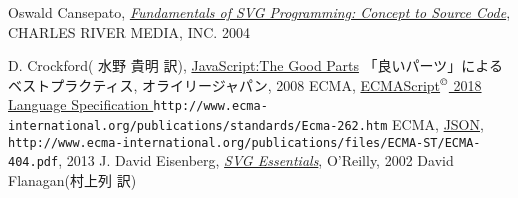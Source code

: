 \begin{thebibliography}{99}
 \iffalse
 \bibitem{WebGL}Andreas Anyuru(吉川 邦夫 訳),
\href{http://www.amazon.co.jp/%E5%AE%9F%E8%B7%B5%E3%83%97%E3%83%AD%E3%82%B0%E3%83%A9%E3%83%9F%E3%83%B3%E3%82%B0WebGL-HTML-JavaScript%E3%81%AB%E3%82%88%E3%82%8B3D%E3%82%B0%E3%83%A9%E3%83%95%E3%82%A3%E3%83%83%E3%82%AF%E3%82%B9%E9%96%8B%E7%99%BA-Programmer%E2%80%99s-SELECTION/dp/4798129534/ref=sr_1_1?ie=UTF8&qid=1365330500&sr=8-1&keywords=%E5%AE%9F%E8%B7%B5%E3%83%97%E3%83%AD%E3%82%B0%E3%83%A9%E3%83%9F%E3%83%B3%E3%82%B0WebGL}
{実践プログラミングWebGL HTML \& JavaScriptによる３Ｄグラフィック},
				 翔泳社, 2012年
				 \fi
\iffalse%
\bibitem{Cagle} Kurt Cagle, 
   \href{http://www.amazon.co.jp/exec/obidos/ASIN/1590590198/qid=1144561984/sr=1-4/ref=sr_1_10_4/249-1775097-0214759}
     {\it SVG Programming: The Graphical Web}, Apress 2002
\fi
\ifSeminor\else
  Oswald Cansepato, 
	\href{http://www.amazon.co.jp/exec/obidos/ASIN/1584502983/qid=1144561984/sr=1-1/ref=sr_1_10_1/249-1775097-0214759}
     {\it Fundamentals of SVG Programming: Concept to
	Source Code}, 
     CHARLES RIVER MEDIA, INC. 2004
\fi
\iffalse
 \bibitem{Cox}David Cox, John Little, Donal O'Shea(落合、示野、西山、室、
	山本訳), グレブナ基底と代数多
	様体入門(上), シュプリンガー・フェアラーク東京 2000
         \fi
\ifSeminor\else
 D. Crockford( 水野 貴明 訳),
	 \href{http://www.amazon.co.jp/JavaScript%253a-Parts-%E2%80%95%E3%80%8C%E8%89%AF%E3%81%84%E3%83%91%E3%83%BC%E3%83%84%E3%80%8D%E3%81%AB%E3%82%88%E3%82%8B%E3%83%99%E3%82%B9%E3%83%88%E3%83%97%E3%83%A9%E3%82%AF%E3%83%86%E3%82%A3%E3%82%B9-Douglas-Crockford/dp/4873113911/ref=sr_1_1?ie=UTF8&qid=1304649181&sr=8-1}{JavaScript:The Good Parts}
         「良いパーツ」によるベストプラクティス, オライリージャパン, 2008
\fi
 ECMA, 
\href{http://www.ecma-international.org/publications/standards/Ecma-262.htm}
				 {ECMAScript$^\copyright$ 2018 Language Specification%
				 }\newline
\texttt{http://www.ecma-international.org/publications/standards/Ecma-262.htm}
\ifSeminor
\else
{}ECMA,
\href{http://www.ecma-international.org/publications/files/ECMA-ST/ECMA-404.pdf}
				{JSON},
\texttt{http://www.ecma-international.org/publications/files/ECMA-ST/ECMA-404.pdf}, 2013
\fi
\ifSeminor
\else
 J. David Eisenberg,
\href{http://www.amazon.co.jp/gp/product/0596002238/250-4160686-1026605?v=glance&n=1000}{\it
	 SVG Essentials}, O'Reilly, 2002
 \fi
 David Flanagan(村上列 訳) 

\end{thebibliography}
